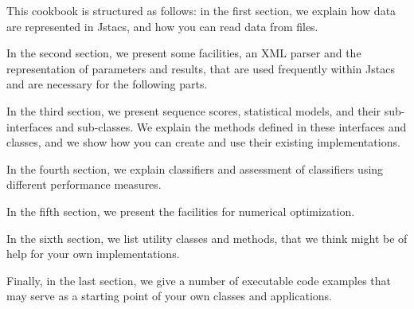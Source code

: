 This cookbook is structured as follows: in the first section, we explain how data are represented in Jstacs, and how you can read data from files. 

In the second section, we present some facilities, an XML parser and the representation of parameters and results, that are used frequently within Jstacs and are necessary for the following parts. 

In the third section, we present sequence scores, statistical models, and their sub-interfaces and sub-classes. We explain the methods defined in these interfaces and classes, and we show how you can create and use their existing implementations.

In the fourth section, we explain classifiers and assessment of classifiers using different performance measures.

In the fifth section, we present the facilities for numerical optimization.

In the sixth section, we list utility classes and methods, that we think might be of help for your own implementations.

Finally, in the last section, we give a number of executable code examples that may serve as a starting point of your own classes and applications.
